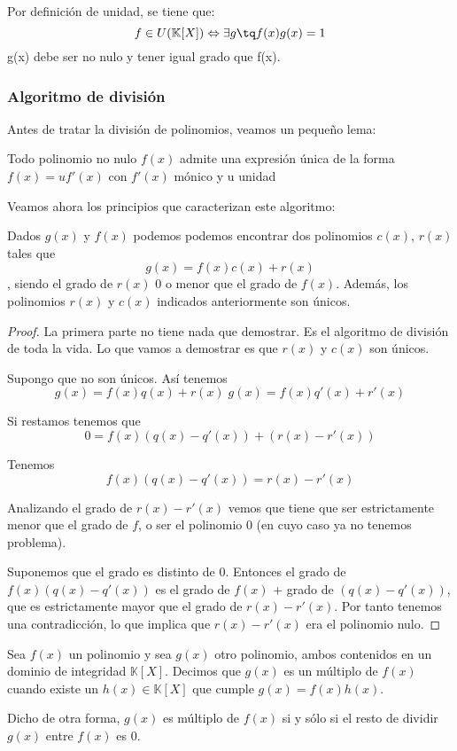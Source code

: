 \documentclass[nochap]{apuntes}
\begin{document}
Por definición de unidad, se tiene que:
\[f\in U(\mathbb{K}[X]) \Leftrightarrow \exists g \tq f(x)g(x)=1\]
g(x) debe ser no nulo y tener igual grado que f(x).

\subsubsection{Algoritmo de división}

Antes de tratar la división de polinomios, veamos un pequeño lema:

\begin{lemma}
 Todo polinomio no nulo $f(x)$ admite una expresión única de la forma $f(x)=uf'(x)$ con $f'(x)$ mónico y u unidad
\end{lemma}

Veamos ahora los principios que caracterizan este algoritmo:

\begin{lemma}
Dados $g(x)$ y $f(x)$ podemos podemos encontrar dos polinomios $c(x)$, $r(x)$ tales que \[ g(x)=f(x)c(x)+r(x) \], siendo el grado de $r(x)$ 0 o menor que el grado de $f(x)$. Además, los polinomios $r(x)$ y $c(x)$ indicados anteriormente son únicos.
\end{lemma}

\begin{proof}
La primera parte no tiene nada que demostrar. Es el algoritmo de división de toda la vida. Lo que vamos a demostrar es que $r(x)$ y $c(x)$ son únicos.

Supongo que no son únicos.
  Así tenemos \[ g(x)=f(x)q(x)+r(x)\; g(x)=f(x)q'(x)+r'(x) \]

  Si restamos tenemos que \[ 0=f(x)(q(x)-q'(x))+(r(x)-r'(x)) \]

  Tenemos \[ f(x)(q(x)-q'(x))=r(x)-r'(x) \]

  Analizando el grado de $r(x)-r'(x)$ vemos que tiene que ser estrictamente menor que el grado de $f$, o ser el polinomio 0 (en cuyo caso ya no tenemos problema).

  Suponemos que el grado es distinto de 0. Entonces el grado de $f(x)(q(x)-q'(x))$ es el grado de $f(x)$ + grado de $(q(x)-q'(x))$, que es estrictamente mayor que el grado de $r(x)-r'(x)$.  Por tanto tenemos una contradicción, lo que implica que $r(x)-r'(x)$ era el polinomio nulo.
\end{proof}

\begin{defn}
 Sea $f(x)$ un polinomio y sea $g(x)$ otro polinomio, ambos contenidos en un dominio de integridad $\mathbb{K}[X]$. Decimos
 que $g(x)$ es un múltiplo de $f(x)$ cuando existe un $h(x)\in \mathbb{K}[X]$ que cumple $g(x)=f(x)h(x)$.

 Dicho de otra forma, $g(x)$ es múltiplo de $f(x)$ si y sólo si el resto de dividir $g(x)$ entre $f(x)$ es 0.
\end{defn}
\end{document}
